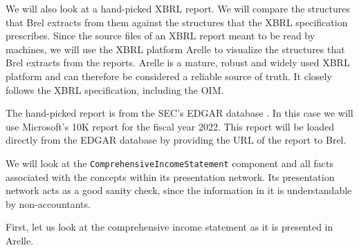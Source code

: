 We will also look at a hand-picked XBRL report.
We will compare the structures that Brel extracts from them against the structures that the XBRL specification prescribes.
Since the source files of an XBRL report meant to be read by machines,
we will use the XBRL platform Arelle to visualize the structures that Brel extracts from the reports.
Arelle is a mature, robust and widely used XBRL platform and can therefore be considered a reliable source of truth.
It closely follows the XBRL specification, including the OIM.


The hand-picked report is from the SEC's EDGAR database \cite{sec_edgar}.
In this case we will use Microsoft's 10K report for the fiscal year 2022\cite{microsoft_edgar}.
This report will be loaded directly from the EDGAR database by providing the URL of the report to Brel.

We will look at the \texttt{ComprehensiveIncomeStatement} component and all facts associated with the concepts within its presentation network.
Its presentation network acts as a good sanity check, since the information in it is understandable by non-accountants.

First, let us look at the comprehensive income statement as it is presented in Arelle.

